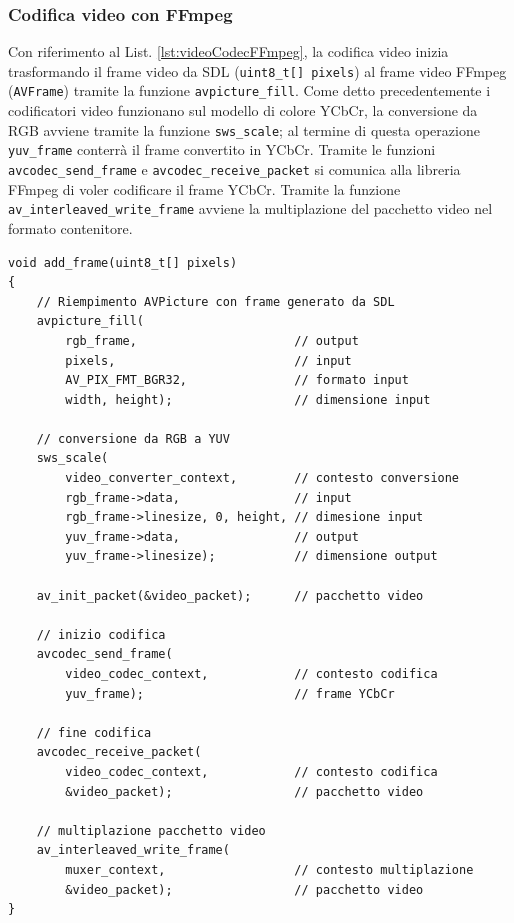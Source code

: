 \subsubsection{Codifica video con FFmpeg}
Con riferimento al List. \ref{lst:videoCodecFFmpeg}, la codifica video inizia trasformando il frame video da SDL (\verb|uint8_t[] pixels|) al frame video FFmpeg (\verb|AVFrame|) tramite la funzione \verb|avpicture_fill|. Come detto precedentemente i codificatori video funzionano sul modello di colore YCbCr, la conversione da RGB avviene tramite la funzione \verb|sws_scale|; al termine di questa operazione \verb|yuv_frame| conterrà il frame convertito in YCbCr. Tramite le funzioni \verb|avcodec_send_frame| e \verb|avcodec_receive_packet| si comunica alla libreria FFmpeg di voler codificare il frame YCbCr. Tramite la funzione \verb|av_interleaved_write_frame| avviene la multiplazione del pacchetto video nel formato contenitore.

\begin{lstlisting}[caption=Codice per la codifica video. File: \detokenize{lib/util/encoding/encode_to_movie.hpp}, label={lst:videoCodecFFmpeg}]
void add_frame(uint8_t[] pixels)
{
	// Riempimento AVPicture con frame generato da SDL
	avpicture_fill(
		rgb_frame, 						// output
		pixels, 						// input
		AV_PIX_FMT_BGR32,				// formato input
		width, height); 				// dimensione input

	// conversione da RGB a YUV
	sws_scale(
		video_converter_context,		// contesto conversione
		rgb_frame->data,				// input
		rgb_frame->linesize, 0, height,	// dimesione input
		yuv_frame->data, 				// output
		yuv_frame->linesize); 			// dimensione output
	
	av_init_packet(&video_packet);		// pacchetto video

	// inizio codifica
	avcodec_send_frame(
		video_codec_context,			// contesto codifica
		yuv_frame);						// frame YCbCr

	// fine codifica
	avcodec_receive_packet(
		video_codec_context,			// contesto codifica
		&video_packet);					// pacchetto video

	// multiplazione pacchetto video
	av_interleaved_write_frame(
		muxer_context,					// contesto multiplazione
		&video_packet);					// pacchetto video
}
\end{lstlisting}



